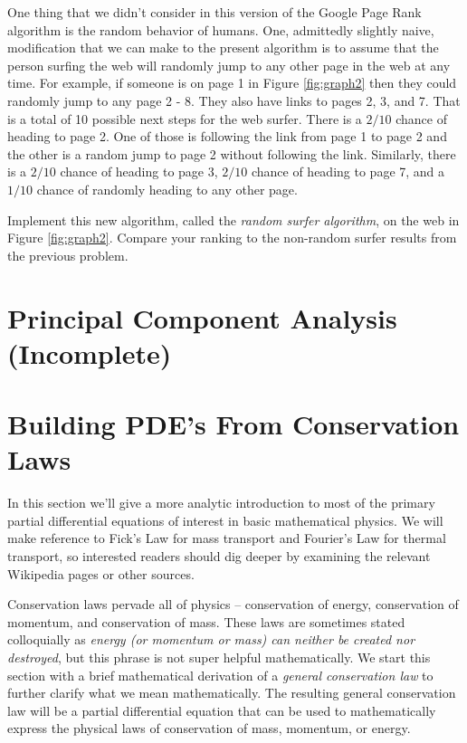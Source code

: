 \begin{problem}
    One thing that we didn't consider in this version of the Google Page Rank algorithm is
    the random behavior of humans.  One, admittedly slightly naive, modification that we
    can make to the present algorithm is to assume that the person surfing the web will
    randomly jump to any other page in the web at any time.  For example, if someone is on
    page 1 in Figure \ref{fig:graph2} then they could randomly jump to any page 2 - 8.
    They also have links to pages 2, 3, and 7.  That is a total of 10 possible next steps
    for the web surfer.  There is a $2/10$ chance of heading to page 2.  One of those is
    following the link from page 1 to page 2 and the other is a random jump to page 2
    without following the link.  Similarly, there is a $2/10$ chance of
    heading to page 3, $2/10$ chance of heading to page 7, and a $1/10$ chance of randomly
    heading to any other page.

    Implement this new algorithm, called the {\it random surfer algorithm}, on the web in
    Figure \ref{fig:graph2}.  Compare your ranking to the non-random surfer results from
    the previous problem.
\end{problem}



\newpage\section{Principal Component Analysis (Incomplete)}

\newpage\section{Building PDE's From Conservation Laws}

In this section
we'll give a more analytic introduction to most of the primary partial
differential equations of interest in basic mathematical physics.  We will make reference
to Fick's Law for mass transport and Fourier's Law for thermal transport, so interested
readers should dig deeper by examining the relevant Wikipedia pages or other sources.
  
Conservation laws pervade all of physics -- conservation of energy, conservation of
momentum, and conservation of mass.  These laws are sometimes stated colloquially as
{\it energy (or momentum or mass) can neither be created nor destroyed}, but this phrase
is not super helpful mathematically.  We start this section with a brief mathematical
derivation of a {\it general conservation law} to further clarify what we mean
mathematically.  The resulting general conservation law will be a
partial differential equation that can be used to mathematically express the physical laws
of conservation of mass, momentum, or
energy.


